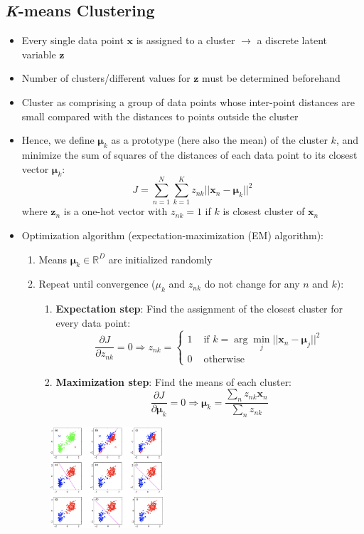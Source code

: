 \subsection{\textit{K}-means Clustering}
\begin{itemize}
	\item Every single data point $\bm{x}$ is assigned to a cluster $\to$ a discrete latent variable $\bm{z}$
	\item Number of clusters/different values for $\bm{z}$ must be determined beforehand
	\item Cluster as comprising a group of data points whose inter-point distances are small compared with the distances to points outside the cluster
	\item Hence, we define $\bm{\mu}_k$ as a prototype (here also the mean) of the cluster $k$, and minimize the sum of squares of the distances of each data point to its closest vector $\bm{\mu}_k$:
	$$J=\sum\limits_{n=1}^{N}\sum\limits_{k=1}^{K} z_{nk} ||\bm{x}_n - \bm{\mu}_k||^2$$
	where $\bm{z}_n$ is a one-hot vector with $z_{nk}=1$ if $k$ is closest cluster of $\bm{x}_n$
	\item Optimization algorithm (expectation-maximization (EM) algorithm):
	\begin{enumerate}
		\item Means $\bm{\mu}_k \in \mathbb{R}^D$ are initialized randomly
		\item Repeat until convergence ($\mu_k$ and $z_{nk}$ do not change for any $n$ and $k$):
		\begin{enumerate}
			\item \textbf{Expectation step}: Find the assignment of the closest cluster for every data point:
			$$\frac{\partial J}{\partial z_{nk}}=0 \Rightarrow z_{nk} = \begin{cases}
			1 & \text{ if } k=\arg\min\limits_j ||\bm{x}_n - \bm{\mu}_j||^2\\
			0 & \text{ otherwise }
			\end{cases}$$
			\item \textbf{Maximization step}: Find the means of each cluster:
			$$\frac{\partial J}{\partial \bm{\mu}_{k}}=0 \Rightarrow \bm{\mu}_k = \frac{\sum_n z_{nk}\bm{x}_n}{\sum_n z_{nk}}$$
		\end{enumerate}
	\end{enumerate}
	\begin{figure}[ht]
		\centering
		\includegraphics[width=0.4\textwidth]{figures/k_means_example.png}

\end{figure}
\end{itemize}
